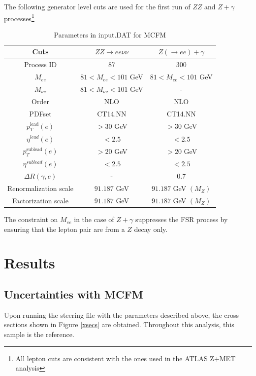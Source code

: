 \documentclass[11pt,a4paper,final]{report}
\begin{document}
The following generator level cuts are used for the first run of $ZZ$ and $Z+\gamma$ processes\footnote{All lepton cuts are consistent with the ones used in the ATLAS Z+MET analysis}
\begin{table}[H]
\begin{center}
	\begin{tabular}{|c|c|c|}
	\hline
	\textbf{Cuts} &$ZZ \rightarrow ee\nu\nu$ & $Z(\rightarrow ee)+\gamma$\\
	\hline
	Process ID & 87 & 300\\
	$M_{ee}$ & $81 < M_{ee} < 101$ GeV & $81 < M_{ee} < 101$ GeV\\
	$M_{\nu\nu}$ & $81 < M_{\nu\nu} < 101$ GeV& -\\
	Order & NLO & NLO\\
	PDFset & CT14.NN & CT14.NN\\
	$p_T^{\text{lead}}(e)$ & $> 30$ GeV & $> 30$ GeV\\
	$\eta^{lead}(e)$ & $< 2.5$ & $< 2.5$\\
	$p_T^{\text{sublead}}(e)$ & $> 20$ GeV & $> 20$ GeV\\
	$\eta^{sublead}(e)$ & $< 2.5$ & $< 2.5$\\
	$\Delta R(\gamma,e)$ & - & 0.7\\
	Renormalization scale & $91.187$ GeV & $91.187$ GeV $(M_{Z})$\\
	Factorization scale & $91.187$ GeV & $91.187$ GeV $(M_{Z})$\\
	\hline
	\end{tabular}
	\caption{Parameters in input.DAT for MCFM}
	\label{table:default}
	\end{center}
\end{table}

The constraint on $M_{ee}$ in the case of $Z+\gamma$ suppresses the FSR process by ensuring that the lepton pair are from a $Z$ decay only.

\section{Results}

\subsection*{Uncertainties with MCFM}
\setcounter{subsection}{1}
Upon running the steering file with the parameters described above, the cross sections shown in Figure \ref{xsecs} are obtained. Throughout this analysis, this sample is the reference.
\end{document}
